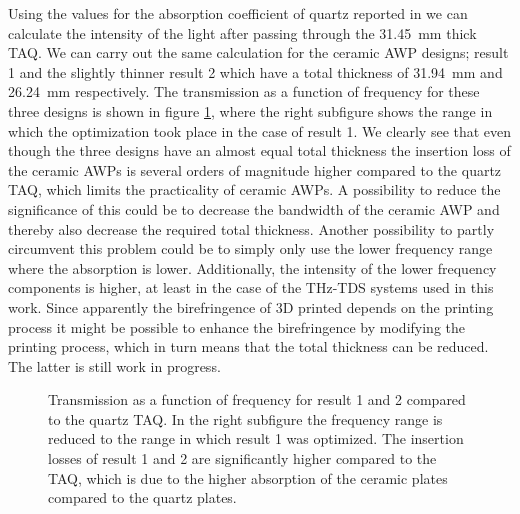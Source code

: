 Using the values for the absorption coefficient of quartz reported in \cite{DGrischkowsky1990} we can calculate the intensity of the light after passing through the \SI{31.45}{\milli \meter} thick TAQ. We can carry out the same calculation for the ceramic AWP designs; result 1 and the slightly thinner result 2 which have a total thickness of \SI{31.94}{\milli \meter} and \SI{26.24}{\milli \meter} respectively. The transmission as a function of frequency for these three designs is shown in figure \ref{fig:cl4_intensity}, where the right subfigure shows the range in which the optimization took place in the case of result 1. We clearly see that even though the three designs have an almost equal total thickness the insertion loss of the ceramic AWPs is several orders of magnitude higher compared to the quartz TAQ, which limits the practicality of ceramic AWPs.
A possibility to reduce the significance of this could be to decrease the bandwidth of the ceramic AWP and thereby also decrease the required total thickness. Another possibility to partly circumvent this problem could be to simply only use the lower frequency range where the absorption is lower. Additionally, the intensity of the lower frequency components is higher, at least in the case of the THz-TDS systems used in this work. Since apparently the birefringence of 3D printed  depends on the printing process it might be possible to enhance the birefringence by modifying the printing process, which in turn means that the total thickness can be reduced. The latter is still work in progress.

\begin{figure}[ht]
    \centering
    
    \caption{Transmission as a function of frequency for result 1 and 2 compared to the quartz TAQ. In the right subfigure the frequency range is reduced to the range in which result 1 was optimized. The insertion losses of result 1 and 2 are significantly higher compared to the TAQ, which is due to the higher absorption of the ceramic plates compared to the quartz plates.}
    \label{fig:cl4_intensity}
\end{figure}


